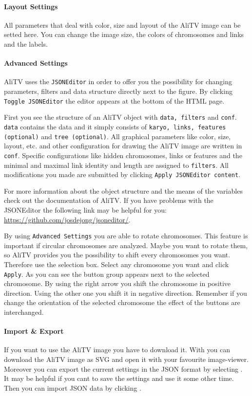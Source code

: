\documentclass[a4paper]{scrartcl}
\begin{document}
\paragraph*{Layout Settings}
All parameters that deal with color, size and layout of the AliTV image can be setted here. You can change the image size, the colors of chromosomes and links and the labels.

\paragraph*{Advanced Settings}
AliTV uses the \texttt{JSONEditor} in order to offer you the possibility for changing parameters, filters and data structure directly next to the figure. By clicking \texttt{Toggle JSONEditor} the editor appears at the bottom of the HTML page. 

First you see the structure of an AliTV object with \texttt{data, filters} and \texttt{conf}. \texttt{data} contains the data and it simply consists of \texttt{karyo, links, features (optional)} and  \texttt{tree (optional)}. All graphical parameters like color, size, layout, etc. and other configuration for drawing the AliTV image are written in \texttt{conf}. Specific configurations like hidden chromosomes, links or features and the minimal and maximal link identity and length are assigned to \texttt{filters}. All modifications you made are submitted by clicking \texttt{Apply JSONEditor content}.

For more information about the object structure and the means of the variables check out the documentation of AliTV. If you have problems with the JSONEditor the following link may be helpful for you: \url{https://github.com/josdejong/jsoneditor/}.

By using \texttt{Advanced Settings} you are able to rotate chromosomes. This feature is important if circular chromosomes are analyzed. Maybe you want to rotate them, so AliTV provides you the possibility to shift every chromosomes you want. Therefore use the selection box. Select any chromosome you want and click \texttt{Apply}. As you can see the button group appears next to the selected chromosome. By using the right arrow you shift the chromosome in positive direction. Using the other one you shift it in negative direction. Remember if you change the orientation of the selected chromosome the effect of the buttons are interchanged.

\paragraph*{Import \& Export}
If you want to use the AliTV image you have to download it. With  you can download the AliTV image as SVG and open it with your favourite image-viewer. Moreover you can export the current settings in the JSON format by selecting . It may be helpful if you cant to save the settings and use it some other time. Then you can import JSON data by clicking .
\end{document}

